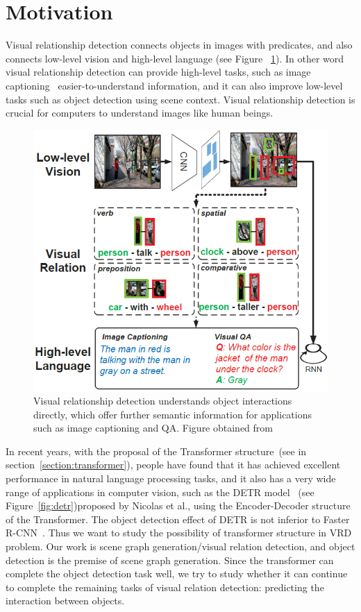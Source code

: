 \section{Motivation}

Visual relationship detection connects objects in images with predicates, and also connects low-level vision and high-level language (see Figure ~\ref{fig:vrd}). In other word visual relationship detection can provide high-level tasks, such as image captioning~\cite{hossain2019comprehensive} easier-to-understand information, and it can also improve low-level tasks such as object detection using scene context. Visual relationship detection is crucial for computers to understand images like human beings.

\begin{figure}[!htbp]
	\centering
	\includegraphics[width = 0.7 \textwidth]{figures/VRD.png}
	\caption[Connection between low-level vision and high-level vision]
	{ Visual relationship detection understands object interactions directly, which offer further semantic information for applications such as image captioning and QA. Figure obtained from ~\cite{zhang2017visual}}
	\label{fig:vrd}
\end{figure}

In recent years, with the proposal of the Transformer structure~\cite{vaswani2017attention}(see in section~\ref{section:transformer}), people have found that it has achieved excellent performance in natural language processing tasks, and it also has a very wide range of applications in computer vision, such as the DETR model~\cite{carion2020end} (see Figure~\ref{fig:detr})proposed by Nicolas et al., using the Encoder-Decoder structure of the Transformer. The object detection effect of DETR is not inferior to Faster R-CNN~\cite{ren2016faster}. Thus we want to study the possibility of transformer structure in VRD problem. Our work is scene graph generation/visual relation detection, and object detection is the premise of scene graph generation. Since the transformer can complete the object detection task well, we try to study whether it can continue to complete the remaining tasks of visual relation detection: predicting the interaction between objects.

